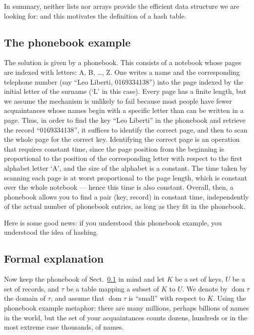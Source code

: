 \documentclass[a4paper]{book}
\theoremstyle{changebreak}                %
\DeclareMathOperator{\dom}{\mathrm{dom}}
\begin{document}
In summary, neither lists nor arrays provide the efficient data
structure we are looking for: and this motivates the definition of a
hash table.

\subsection{The phonebook example}
\label{s:hash:phonebook}
The solution is given by a phonebook. This consists of a notebook
whose pages are indexed with letters: A, B, \dots, Z. One writes a
name and the corresponding telephone number (say ``Leo Liberti,
0169334138'') into the page indexed by the initial letter of the
surname (`L' in this case). Every page has a finite length, but we
assume the mechanism is unlikely to fail because most people have
fewer acquaintances whose names begin with a specific letter than can
be written in a page. Thus, in order to find the key ``Leo Liberti''
in the phonebook and retrieve the record ``0169334138'', it suffices
to identify the correct page, and then to scan the whole page for the
correct key. Identifying the correct page is an operation that
requires constant time, since the page position from the beginning is
proportional to the position of the corresponding letter with respect
to the first alphabet letter `A', and the size of the alphabet is a
constant. The time taken by scanning each page is at worst
proportional to the page length, which is constant over the whole
notebook --- hence this time is also constant. Overall, then, a
phonebook allows you to find a pair (key, record) in constant time,
independently of the actual number of phonebook entries, as long as
they fit in the phonebook.

Here is some good news: if you understood this phonebook example, you
understood the idea of hashing.

\subsection{Formal explanation}
Now keep the phonebook of Sect.~\ref{s:hash:phonebook} in mind and let
$K$ be a set of keys, $U$ be a set of records, and $\tau$ be a table
mapping a subset of $K$ to $U$. We denote by $\dom{\tau}$ the
domain of $\tau$, and assume that $\dom{\tau}$ is
``small'' with respect to $K$. Using the phonebook example metaphor:
there are many millions, perhaps billions of names in the world, but
the set of your acquaintances counts dozens, hundreds or in the most
extreme case thousands, of names.
\end{document}
